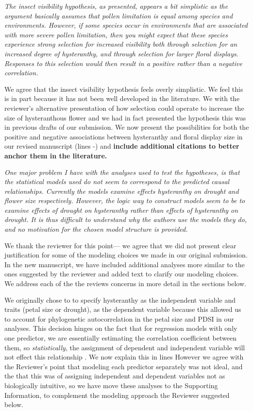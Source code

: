 \documentclass{article}[12pt]
\begin{document}
\emph{The insect visibility hypothesis, as presented, appears a bit simplistic as the argument basically assumes that pollen limitation is equal among species and environments. However, if some species occur in environments that are associated with more severe pollen limitation, then you might expect that these species experience strong selection for increased visibility both through selection for an increased degree of hysteranthy, and through selection for larger floral displays. Responses to this selection would then result in a positive rather than a negative correlation.}

We agree that the insect visibility hypothesis feels overly simplistic. We feel this is in part because it has not been well developed in the literature. We with the reviewer's alternative presentation of how selection could operate to increase the size of hysteranthous flower and we had in fact presented the hypothesis this was in previous drafts of our submission. We now present the possibilities for both the positive and negative associations between hysteranthy and floral display size in our revised manuscript (lines -) and \textbf{include additional citations to better anchor them in the literature.} 

\emph{One major problem I have with the analyses used to test the hypotheses, is that the statistical models used do not seem to correspond to the predicted causal relationships. Currently the models examine effects hysteranthy on drought and flower size respectively. However, the logic way to construct models seem to be to examine effects of drought on hysteranthy rather than effects of hysteranthy on drought. It is thus difficult to understand why the authors use the models they do, and no motivation for the chosen model structure is provided.}

We thank the reviewer for this point--- we agree that we did not present clear justification for some of the modeling choices we made in our original submission. In the new manuscript, we have included additional analyses more similar to the ones suggested by the reviewer and added text to clarify our modeling choices. We address each of the the reviews concerns in more detail in the sections below.

We originally chose to to specify hysteranthy as the independent variable and traits (petal size or drought), as the dependent variable because this allowed us to account for phylogenetic autocorrelation in the petal size and PDSI in our analyses. This decision  hinges on the fact that for regression models with only one predictor, we are essentially estimating the correlation coefficient between them, so \emph{statistically}, the assignment of dependent and independent variable will not effect this relationship \citep{}. We now explain this in lines  However we agree with the Reviewer's point that modeling each predictor separately was not ideal, and the that this was of assigning independent and dependent variables not as biologically intuitive, so we have move these analyses to the Supporting Information, to complement the modeling approach the Reviewer suggested below.
\end{document}
